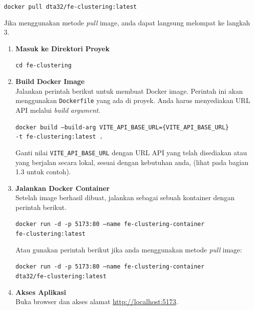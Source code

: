 \documentclass{article}
\newcommand{\inlinecode}[1]{%
    \begin{mdframed}[style=codestyle]
    \texttt{\small #1}
    \end{mdframed}
}
\begin{document}
    \inlinecode{docker pull dta32/fe-clustering:latest}
    Jika menggunakan metode \textit{pull} image, anda dapat langsung melompat ke langkah 3.
    \begin{enumerate}
        \item \textbf{Masuk ke Direktori Proyek}

        \inlinecode{cd fe-clustering}

        \item \textbf{Build Docker Image} \\
        Jalankan perintah berikut untuk membuat Docker image.
        Perintah ini akan menggunakan \texttt{Dockerfile} yang ada di proyek.
        Anda harus menyediakan URL API melalui \textit{build argument}.

        \begin{mdframed}[style=codestyle]
            \small\texttt{docker build --build-arg VITE\_API\_BASE\_URL=\{VITE\_API\_BASE\_URL\}} \\
            \small\texttt{-t fe-clustering:latest .}
        \end{mdframed}

        Ganti nilai \texttt{VITE\_API\_BASE\_URL} dengan URL API yang telah disediakan atau yang berjalan secara lokal,
        sesuai dengan kebutuhan anda, (lihat pada bagian 1.3 untuk contoh).

        \item \textbf{Jalankan Docker Container} \\
        Setelah image berhasil dibuat, jalankan sebagai sebuah kontainer dengan perintah berikut.

        \begin{mdframed}[style=codestyle]
            \small\texttt{docker run -d -p 5173:80 --name fe-clustering-container} \\
            \small\texttt{fe-clustering:latest}
        \end{mdframed}

        Atau gunakan perintah berikut jika anda menggunakan metode \textit{pull} image:

        \begin{mdframed}[style=codestyle]
            \small\texttt{docker run -d -p 5173:80 --name fe-clustering-container} \\
            \small\texttt{dta32/fe-clustering:latest}
        \end{mdframed}

        \item \textbf{Akses Aplikasi} \\
        Buka browser dan akses alamat \url{http://localhost:5173}.
    \end{enumerate}
\end{document}
